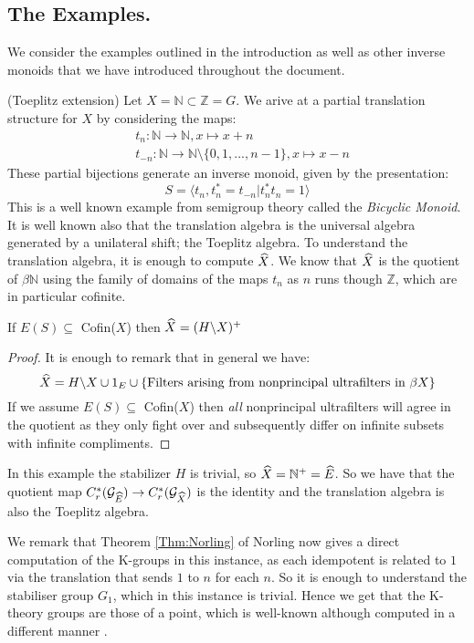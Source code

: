 \subsection{The Examples.}
We consider the examples outlined in the introduction as well as other inverse monoids that we have introduced throughout the document.
\begin{example}\label{Ex:Toe}(Toeplitz extension)
Let $X=\mathbb{N} \subset \mathbb{Z}=G$. We arive at a partial translation structure for $X$ by considering the maps:
\begin{eqnarray*}
& t_{n}: \mathbb{N} \rightarrow \mathbb{N}, x \mapsto x+n \\
&t_{-n}: \mathbb{N} \rightarrow \mathbb{N}\setminus \lbrace 0,1,...,n-1 \rbrace , x \mapsto x-n
\end{eqnarray*} 
These partial bijections generate an inverse monoid, given by the presentation:
\begin{equation*}
S=\langle t_{n},t_{n}^{*}=t_{-n} | t_{n}^{*}t_{n}=1 \rangle
\end{equation*}
This is a well known example from semigroup theory called the \textit{Bicyclic Monoid}. It is well known also that the translation algebra is the universal algebra generated by a unilateral shift; the Toeplitz algebra. To understand the translation algebra, it is enough to compute $\widehat{X}$. We know that $\widehat{X}$ is the quotient of $\beta \mathbb{N}$ using the family of domains of the maps $t_{n}$ as $n$ runs though $\mathbb{Z}$, which are in particular cofinite.

\begin{claim}\label{prop:example}
If $E(S) \subseteq $ Cofin($X$) then $\widehat{X} = (H \backslash X)^{+}$   
\end{claim}
\begin{proof}
It is enough to remark that in general we have:
\begin{equation*}
\widehat{X} = H\backslash X \cup {1_{E}} \cup \lbrace \mbox{Filters arising from nonprincipal ultrafilters in } \beta X \rbrace
\end{equation*} If we assume $E(S) \subseteq $ Cofin($X$) then \textit{all} nonprincipal ultrafilters will agree in the quotient as they only fight over and subsequently differ on infinite subsets with infinite compliments.
\end{proof}

In this example the stabilizer $H$ is trivial, so $\widehat{X} = \mathbb{N}^{+} = \widehat{E}$. So we have that the quotient map $C^{*}_{r}(\mathcal{G}_{\widehat{E}}) \rightarrow C^{*}_{r}(\mathcal{G}_{\widehat{X}})$ is the identity and the translation algebra is also the Toeplitz algebra.

We remark that Theorem \ref{Thm:Norling} of Norling now gives a direct computation of the K-groups in this instance, as each idempotent is related to $1$ via the translation that sends $1$ to $n$ for each $n$. So it is enough to understand the stabiliser group $G_{1}$, which in this instance is trivial. Hence we get that the K-theory groups are those of a point, which is well-known although computed in a different manner \cite{MR587369,MR2457037}.
\end{example}

